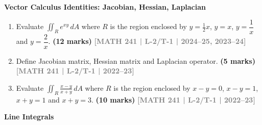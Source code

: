 \documentclass[12pt,a3paper]{article}
\newcommand{\yr}[1]{\hfill\textcolor{gray}{\small\textbf{[#1]}}}
\newcommand{\mk}[1]{\textcolor{orange!70!black}{\small\textbf{(#1 marks)}}}
\newcommand{\subtopic}[2]{%
  \vspace{10pt}
  \noindent\begin{tcolorbox}[colback=#1!8,colframe=#1,boxrule=0.6pt,arc=4pt,
    left=6pt,right=6pt,top=4pt,bottom=4pt]
    \small\bfseries\textcolor{#1}{#2}
  \end{tcolorbox}
  \vspace{2pt}
}
\begin{document}
\subtopic{cD}{Vector Calculus Identities: Jacobian, Hessian, Laplacian}
\label{sub:s4-identities}

\begin{enumerate}
    
\item Evaluate $\displaystyle\iint_{R}e^{xy}\,dA$ where $R$ is the region enclosed by $y=\tfrac{1}{2}x$, $y=x$, $y=\dfrac{1}{x}$ and $y=\dfrac{2}{x}$.
\mk{12} \yr{MATH 241 | L-2/T-1 | 2024--25, 2023--24}


\item Define Jacobian matrix, Hessian matrix and Laplacian operator.
\mk{5} \yr{MATH 241 | L-2/T-1 | 2022--23}


\item Evaluate $\displaystyle\iint_{R}\frac{x-y}{x+y}\,dA$ where $R$ is the region enclosed by $x-y=0$, $x-y=1$, $x+y=1$ and $x+y=3$.
\mk{10} \yr{MATH 241 | L-2/T-1 | 2022--23}



\end{enumerate}

\subtopic{cD}{Line Integrals}
\label{sub:s4-lineint}
\end{document}
